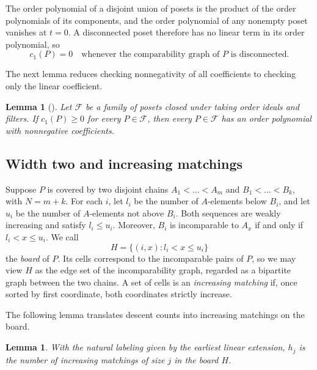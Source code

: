 \documentclass[11pt]{amsart}
\newtheorem{lemma}[theorem]{Lemma}
\theoremstyle{remark}
\numberwithin{equation}{section}
\newcommand{\lin}{c_1}
\begin{document}
The order polynomial of a disjoint union of posets is the product of the order
polynomials of its components, and the order polynomial of any nonempty poset
vanishes at $t=0$. A disconnected poset therefore has no linear term in its
order polynomial, so
\begin{equation}\label{eq:disconnected}
 \lin(P)=0\quad\text{whenever the comparability graph of $P$ is disconnected.}
\end{equation}

The next lemma reduces checking nonnegativity of all coefficients to checking
only the linear coefficient.

\begin{lemma}[{\cite[Theorem~3.4]{FMP}}]\label{lem:reduction}
Let $\mathcal F$ be a family of posets closed under taking order ideals and
filters. If $\lin(P)\ge0$ for every $P\in\mathcal F$, then every $P\in\mathcal F$
has an order polynomial with nonnegative coefficients.
\end{lemma}

\subsection{Width two and increasing matchings}
Suppose $P$ is covered by two disjoint chains $A_1<\dots<A_m$ and
$B_1<\dots<B_k$, with $N=m+k$. For each $i$, let $l_i$ be the number of
$A$-elements below $B_i$, and let $u_i$ be the number of $A$-elements not above
$B_i$. Both sequences are weakly increasing and satisfy $l_i\le u_i$. Moreover,
$B_i$ is incomparable to $A_x$ if and only if $l_i<x\le u_i$. We call
\[
 H=\{(i,x): l_i<x\le u_i\}
\]
the \emph{board} of $P$. Its cells correspond to the incomparable pairs of $P$,
so we may view $H$ as the edge set of the incomparability graph, regarded as a
bipartite graph between the two chains. A set of cells is an
\emph{increasing matching} if, once sorted by first coordinate, both coordinates
strictly increase.

The following lemma translates descent counts into increasing matchings on the
board.

\begin{lemma}\label{lem:matchings}
With the natural labeling given by the earliest linear extension, $h_j$ is the
number of increasing matchings of size $j$ in the board $H$.
\end{lemma}
\end{document}
